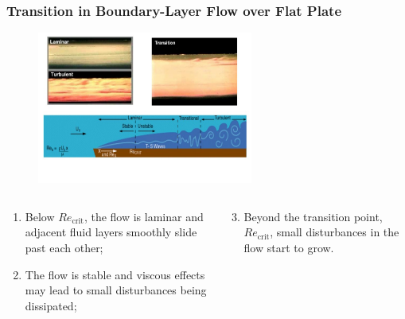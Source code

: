 \documentclass[10pt,compress]{beamer}
\begin{document}
\begin{frame}
 \frametitle{Transition in Boundary-Layer Flow over Flat Plate}
   \begin{figure}%
    \begin{center}
     \includegraphics[width=12.cm, height=5cm, clip]{./Figs/Transition2Turbulence3b}
    \end{center}
   \end{figure}  
  \vspace{-1cm}  
  \begin{columns}
    \begin{column}[l]{0.5\linewidth}
       \begin{enumerate}%
           \item<1-> Below $Re_{\text{crit}}$, the flow is laminar and adjacent fluid layers smoothly slide past each other;
           \item<1-> The flow is stable and viscous effects may lead to small disturbances being dissipated;

       \end{enumerate}
    \end{column}
    \begin{column}[l]{0.5\linewidth}
       \begin{enumerate}\setcounter{enumi}{2}%
           \item<1-> Beyond the transition point, $Re_{\text{crit}}$, small disturbances in the flow start to grow.
       \end{enumerate} 
    \end{column}
  \end{columns}

\end{frame}
\end{document}
